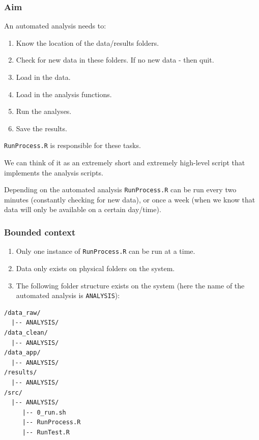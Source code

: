 \documentclass[12pt,]{article}
\providecommand{\tightlist}{%
  \setlength{\itemsep}{0pt}\setlength{\parskip}{0pt}}
\begin{document}
\subsubsection{Aim}\label{aim}

An automated analysis needs to:

\begin{enumerate}
\def\labelenumi{\arabic{enumi}.}
\tightlist
\item
  Know the location of the data/results folders.
\item
  Check for new data in these folders. If no new data - then quit.
\item
  Load in the data.
\item
  Load in the analysis functions.
\item
  Run the analyses.
\item
  Save the results.
\end{enumerate}

\texttt{RunProcess.R} is responsible for these tasks.

We can think of it as an extremely short and extremely high-level script
that implements the analysis scripts.

Depending on the automated analysis \texttt{RunProcess.R} can be run
every two minutes (constantly checking for new data), or once a week
(when we know that data will only be available on a certain day/time).

\subsubsection{Bounded context}\label{bounded-context}

\begin{enumerate}
\def\labelenumi{\arabic{enumi}.}
\tightlist
\item
  Only one instance of \texttt{RunProcess.R} can be run at a time.
\item
  Data only exists on physical folders on the system.
\item
  The following folder structure exists on the system (here the name of
  the automated analysis is \texttt{ANALYSIS}):
\end{enumerate}

\begin{verbatim}
/data_raw/
  |-- ANALYSIS/
/data_clean/
  |-- ANALYSIS/
/data_app/
  |-- ANALYSIS/
/results/
  |-- ANALYSIS/
/src/
  |-- ANALYSIS/
     |-- 0_run.sh
     |-- RunProcess.R
     |-- RunTest.R
\end{verbatim}
\end{document}
